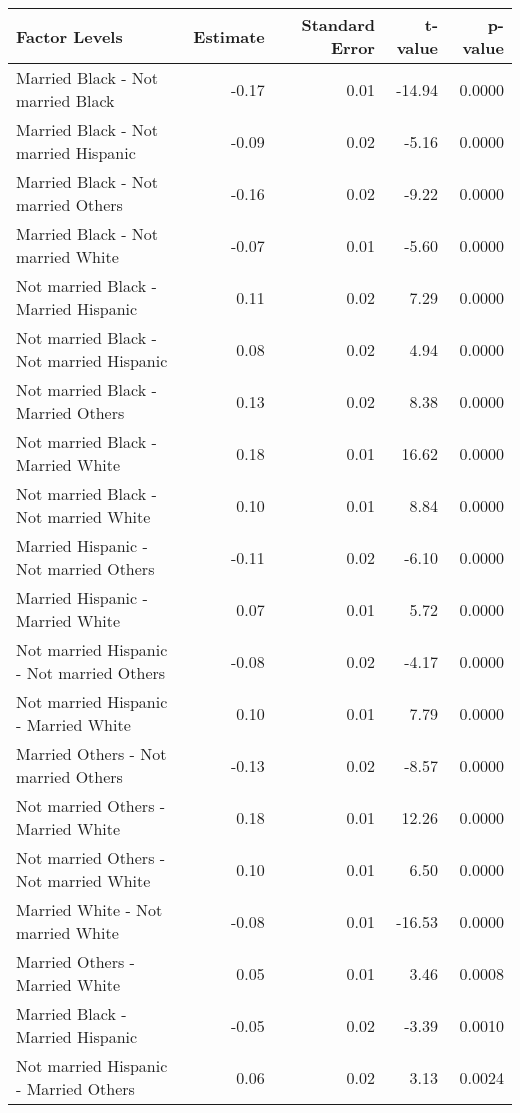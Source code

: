 \begin{table}[H]
\footnotesize
\centering
\begin{tabular}{lrrrr}
  \hline
Factor Levels & Estimate & Standard Error & t-value & p-value \\ 
  \hline
  Married Black -  Not married Black & -0.17 & 0.01 & -14.94 & 0.0000 \\ 
    Married Black -  Not married Hispanic & -0.09 & 0.02 & -5.16 & 0.0000 \\ 
    Married Black -  Not married Others & -0.16 & 0.02 & -9.22 & 0.0000 \\ 
    Married Black -  Not married White & -0.07 & 0.01 & -5.60 & 0.0000 \\ 
    Not married Black -  Married Hispanic & 0.11 & 0.02 & 7.29 & 0.0000 \\ 
    Not married Black -  Not married Hispanic & 0.08 & 0.02 & 4.94 & 0.0000 \\ 
    Not married Black -  Married Others & 0.13 & 0.02 & 8.38 & 0.0000 \\ 
    Not married Black -  Married White & 0.18 & 0.01 & 16.62 & 0.0000 \\ 
    Not married Black -  Not married White & 0.10 & 0.01 & 8.84 & 0.0000 \\ 
    Married Hispanic -  Not married Others & -0.11 & 0.02 & -6.10 & 0.0000 \\ 
    Married Hispanic -  Married White & 0.07 & 0.01 & 5.72 & 0.0000 \\ 
    Not married Hispanic -  Not married Others & -0.08 & 0.02 & -4.17 & 0.0000 \\ 
    Not married Hispanic -  Married White & 0.10 & 0.01 & 7.79 & 0.0000 \\ 
    Married Others -  Not married Others & -0.13 & 0.02 & -8.57 & 0.0000 \\ 
    Not married Others -  Married White & 0.18 & 0.01 & 12.26 & 0.0000 \\ 
    Not married Others -  Not married White & 0.10 & 0.01 & 6.50 & 0.0000 \\ 
    Married White -  Not married White & -0.08 & 0.01 & -16.53 & 0.0000 \\ 
    Married Others -  Married White & 0.05 & 0.01 & 3.46 & 0.0008 \\ 
    Married Black -  Married Hispanic & -0.05 & 0.02 & -3.39 & 0.0010 \\ 
    Not married Hispanic -  Married Others & 0.06 & 0.02 & 3.13 & 0.0024 \\ 

\end{tabular}
\end{table}
